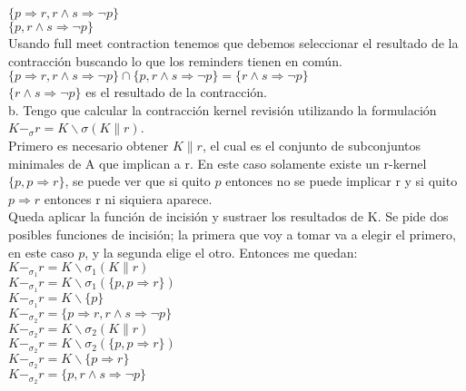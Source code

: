 $\{p \Longrightarrow r , r \land s \Longrightarrow \neg p \}$ \\
	
$\{p, r \land s \Longrightarrow \neg p \}$ \\

Usando full meet contraction tenemos que debemos seleccionar el resultado de la contracción buscando lo que los reminders tienen en común. \\

$\{p \Longrightarrow r , r \land s \Longrightarrow \neg p \} \cap \{p, r \land s  \Longrightarrow \neg p \} = \{r \land s \Longrightarrow \neg p\}$ \\

$\{r \land s  \Longrightarrow \neg p\}$ es el resultado de la contracción. \\

b. Tengo que calcular la contracción kernel revisión utilizando la formulación $K-_{\sigma}r = K \backslash \sigma(K \| r)$. \\

Primero es necesario obtener $K \| r$, el cual es el conjunto de subconjuntos minimales de A que implican a r. En este caso solamente existe un r-kernel $\{p, p \Longrightarrow r\}$, se puede ver que si quito $p$ entonces no se puede implicar r y si quito $p \Longrightarrow  r$ entonces r ni siquiera aparece. \\

Queda aplicar la función de incisión y sustraer los resultados de K. Se pide dos posibles funciones de incisión; la primera que voy a tomar va a elegir el primero, en este caso $p$, y la segunda elige el otro. Entonces me quedan: \\

$K-_{\sigma_{1}}r = K \backslash \sigma_{1}(K \| r)$ \\
$K-_{\sigma_{1}}r = K \backslash \sigma_{1}(\{p, p \Longrightarrow r\})$ \\
$K-_{\sigma_{1}}r = K \backslash \{p\}$ \\
$K-_{\sigma_{2}}r = \{p \Longrightarrow r , r \land s \Longrightarrow \neg p \}$ \\

$K-_{\sigma_{2}}r = K \backslash \sigma_{2}(K \| r)$ \\
$K-_{\sigma_{2}}r = K \backslash \sigma_{2}(\{p, p \Longrightarrow r\})$ \\
$K-_{\sigma_{2}}r = K \backslash \{p \Longrightarrow r\}$ \\
$K-_{\sigma_{2}}r = \{p, r \land s \Longrightarrow \neg p \}$ \\


